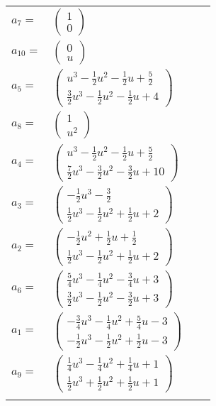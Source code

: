 \documentclass[1p]{elsarticle_modified}
\theoremstyle{definition}
\begin{document}
\begin{tabular}{m{7pt} m{180pt} m{7pt} m{180pt} }
\flushright $a_{7}=$&$\begin{pmatrix}1\\0\end{pmatrix}$ \\
\flushright $a_{10}=$&$\begin{pmatrix}0\\u\end{pmatrix}$ \\
\flushright $a_{5}=$&$\begin{pmatrix}u^3-\frac{1}{2} u^2-\frac{1}{2} u+\frac{5}{2}\\\frac{3}{2} u^3-\frac{1}{2} u^2-\frac{1}{2} u+4\end{pmatrix}$ \\
\flushright $a_{8}=$&$\begin{pmatrix}1\\u^2\end{pmatrix}$ \\
\flushright $a_{4}=$&$\begin{pmatrix}u^3-\frac{1}{2} u^2-\frac{1}{2} u+\frac{5}{2}\\\frac{7}{2} u^3-\frac{3}{2} u^2-\frac{3}{2} u+10\end{pmatrix}$ \\
\flushright $a_{3}=$&$\begin{pmatrix}-\frac{1}{2} u^3-\frac{3}{2}\\\frac{1}{2} u^3-\frac{1}{2} u^2+\frac{1}{2} u+2\end{pmatrix}$ \\
\flushright $a_{2}=$&$\begin{pmatrix}-\frac{1}{2} u^2+\frac{1}{2} u+\frac{1}{2}\\\frac{1}{2} u^3-\frac{1}{2} u^2+\frac{1}{2} u+2\end{pmatrix}$ \\
\flushright $a_{6}=$&$\begin{pmatrix}\frac{5}{4} u^3-\frac{1}{4} u^2-\frac{3}{4} u+3\\\frac{3}{2} u^3-\frac{1}{2} u^2-\frac{3}{2} u+3\end{pmatrix}$ \\
\flushright $a_{1}=$&$\begin{pmatrix}-\frac{3}{4} u^3-\frac{1}{4} u^2+\frac{5}{4} u-3\\-\frac{1}{2} u^3-\frac{1}{2} u^2+\frac{1}{2} u-3\end{pmatrix}$ \\
\flushright $a_{9}=$&$\begin{pmatrix}\frac{1}{4} u^3-\frac{1}{4} u^2+\frac{1}{4} u+1\\\frac{1}{2} u^3+\frac{1}{2} u^2+\frac{1}{2} u+1\end{pmatrix}$\\&\end{tabular}
\end{document}
